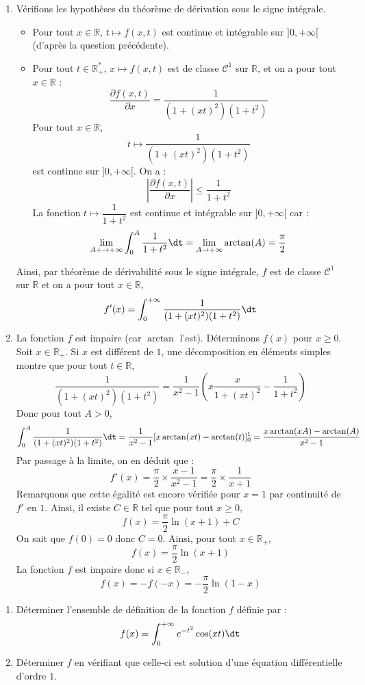 \documentclass[a4paper,10pt]{report}
\begin{document}
\begin{enumerate}
\noindent Finalement, $f$ est définie sur $\mathbb{R}$.
\item Vérifions les hypothèses du théorème de dérivation sous le signe intégrale.
\begin{itemize}
\item Pour tout $x \in \mathbb{R}$, $t \mapsto f(x,t)$ est continue et intégrable sur $]0, + \infty[$ (d'après la question précédente).
\item Pour tout $t \in \mathbb{R}_+^{*}$, $x \mapsto f(x,t)$ est de classe $\mathcal{C}^1$ sur $\mathbb{R}$, et on a pour tout $x \in \mathbb{R}$ :
$$ \dfrac{\partial f(x,t)}{\partial x} = \dfrac{1}{(1+(xt)^2)(1+t^2)}$$
Pour tout $x \in \mathbb{R}$,
$$ t \mapsto \dfrac{1}{(1+(xt)^2)(1+t^2)}$$
est continue sur $]0,+ \infty[$. On a :
$$ \left\vert \dfrac{\partial f(x,t)}{\partial x} \right\vert \leq \dfrac{1}{1+t^2}$$
La fonction $t \mapsto \dfrac{1}{1+t^2}$ est continue et intégrable sur $]0, + \infty[$ car :
$$ \lim_{A + \rightarrow + \infty} \int_{0}^A \dfrac{1}{1+t^2} \dt = \lim_{A \rightarrow + \infty} \arctan(A) = \dfrac{\pi}{2}$$
\end{itemize}
Ainsi, par théorème de dérivabilité sous le signe intégrale, $f$ est de classe $\mathcal{C}^1$ sur $\mathbb{R}$ et on a pour tout $x \in \mathbb{R}$,
$$ f'(x) = \int_{0}^{+ \infty} \dfrac{1}{(1+(xt)^2)(1+t^2)} \dt$$
\item La fonction $f$ est impaire (car $\arctan$ l'est). Déterminons $f(x)$ pour $x \geq 0$. Soit $x \in \mathbb{R}_+$. Si $x$ est différent de $1$, une décomposition en éléments simples montre que pour tout $t \in \mathbb{R}$,
$$ \dfrac{1}{(1+(xt)^2)(1+t^2)} = \dfrac{1}{x^2-1} \left( x\dfrac{x}{1+(xt)^2} - \dfrac{1}{1+t^2} \right)$$
Donc pour tout $A>0$,
$$ \int_{0}^A \dfrac{1}{(1+(xt)^2)(1+t^2)} \dt = \dfrac{1}{x^2-1} [ x \arctan(xt)- \arctan(t) ]_0^1 = \dfrac{x\arctan(xA) - \arctan(A)}{x^2-1}$$
Par passage à la limite, on en déduit que :
$$ f'(x) = \dfrac{\pi}{2} \times \dfrac{x-1}{x^2-1} = \dfrac{\pi}{2} \times \dfrac{1}{x+1}$$
Remarquons que cette égalité est encore vérifiée pour $x=1$ par continuité de $f'$ en $1$. Ainsi, il existe $C \in \mathbb{R}$ tel que pour tout $x \geq 0$,
$$ f(x) = \dfrac{\pi}{2} \ln(x+1) + C$$
On sait que $f(0)=0$ donc $C=0$. Ainsi, pour tout $x \in \mathbb{R}_+$,
$$ f(x) = \dfrac{\pi}{2} \ln(x+1) $$
La fonction $f$ est impaire donc si $x \in \mathbb{R}_{-}$,
$$ f(x) = - f(-x) = -\dfrac{\pi}{2} \ln(1-x)$$
\end{enumerate}


\begin{Exa}
\begin{enumerate}
\item Déterminer l'ensemble de définition de la fonction $f$ définie par :
$$ f(x) = \int_{0}^{+ \infty} e^{-t^2} \cos(xt) \dt$$
\item Déterminer $f$ en vérifiant que celle-ci est solution d'une équation différentielle d'ordre $1$.
\end{enumerate}
\end{Exa}
\end{document}
